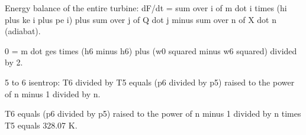 Energy balance of the entire turbine:
dF/dt = sum over i of m dot i times (hi plus ke i plus pe i) plus sum over j of Q dot j minus sum over n of X dot n (adiabat).

0 = m dot ges times (h6 minus h6) plus (w0 squared minus w6 squared) divided by 2.

5 to 6 isentrop:
T6 divided by T5 equals (p6 divided by p5) raised to the power of n minus 1 divided by n.

T6 equals (p6 divided by p5) raised to the power of n minus 1 divided by n times T5 equals 328.07 K.